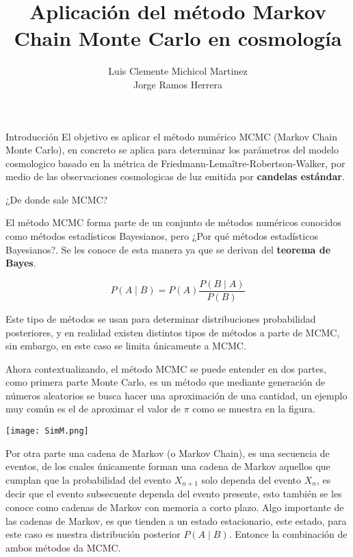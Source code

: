 \documentclass[10pt]{beamer}
\author{Luis Clemente Michicol Martinez\\
Jorge Ramos Herrera}
\title{Aplicación del método Markov Chain Monte Carlo en cosmología}
\institute{Benemérita Universidad Autónoma de Puebla}
\begin{document}
\begin{frame}
\titlepage
\end{frame}


\begin{frame}{Introducción}
El objetivo es aplicar el método numérico MCMC (Markov Chain Monte Carlo), en concreto se aplica para determinar los parámetros del modelo cosmologico basado en la métrica de Friedmann-Lemaître-Robertson-Walker, por medio de las observaciones cosmologicas de luz emitida por \textbf{candelas estándar}.
\end{frame}

\begin{frame}{¿De donde sale MCMC?}

El método MCMC forma parte de un conjunto de métodos numéricos conocidos como métodos estadísticos Bayesianos, pero ¿Por qué métodos estadísticos Bayesianos?. Se les conoce de esta manera ya que se derivan del \textbf{teorema de Bayes}.

\begin{equation}
	P(A\mid B) = P(A) \frac{P(B\mid A)}{P(B)}
\end{equation}

Este tipo de métodos se usan para determinar distribuciones probabilidad posteriores, y en realidad existen distintos tipos de métodos a parte de MCMC, sin embargo, en este caso se limita únicamente a MCMC.

\end{frame}

\begin{frame}
Ahora contextualizando, el método MCMC se puede entender en dos partes, como primera parte Monte Carlo, es un método que mediante generación de números aleatorios se busca hacer una aproximación de una cantidad, un ejemplo muy común es el de aproximar el valor de $\pi$ como se muestra en la figura.
\begin{center}
\texttt{[image: SimM.png]} 
\end{center}


\end{frame}

\begin{frame}
Por otra parte una cadena de Markov (o Markov Chain), es una secuencia de eventos, de los cuales únicamente forman una cadena de Markov aquellos que cumplan que la probabilidad del evento $X_{n+1}$ solo dependa del evento $X_n$, es decir que el evento subsecuente dependa del evento presente, esto también se les conoce como cadenas de Markov con memoria a corto plazo.
Algo importante de las cadenas de Markov, es que tienden a un estado estacionario, este estado, para este caso es nuestra distribución posterior $P(A\mid B)$.
Entonce la combinación de ambos métodos da MCMC.
\end{frame}
\end{document}
